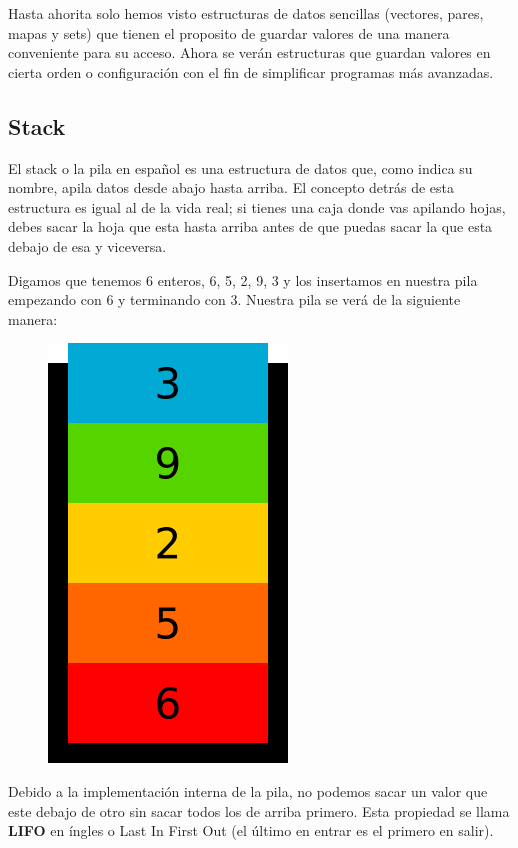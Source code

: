 \documentclass{article}
\begin{document}
Hasta ahorita solo hemos visto estructuras de datos sencillas (vectores, pares, mapas y sets) que tienen el proposito de guardar valores de una manera conveniente para su acceso. Ahora se verán estructuras que guardan valores en cierta orden o configuración con el fin de simplificar programas más avanzadas.

\subsection{Stack}

El stack o la pila en español es una estructura de datos que, como indica su nombre, apila datos desde abajo hasta arriba. El concepto detrás de esta estructura es igual al de la vida real; si tienes una caja donde vas apilando hojas, debes sacar la hoja que esta hasta arriba antes de que puedas sacar la que esta debajo de esa y viceversa.

Digamos que tenemos 6 enteros, {6, 5, 2, 9, 3} y los insertamos en nuestra pila empezando con 6 y terminando con 3. Nuestra pila se verá de la siguiente manera:

\begin{figure}[H]
    \centering
    \includegraphics[width=0.1\paperwidth]{pila}
\end{figure}

Debido a la implementación interna de la pila, no podemos sacar un valor que este debajo de otro sin sacar todos los de arriba primero. Esta propiedad se llama \textbf{LIFO} en íngles o Last In First Out (el último en entrar es el primero en salir).
\end{document}
